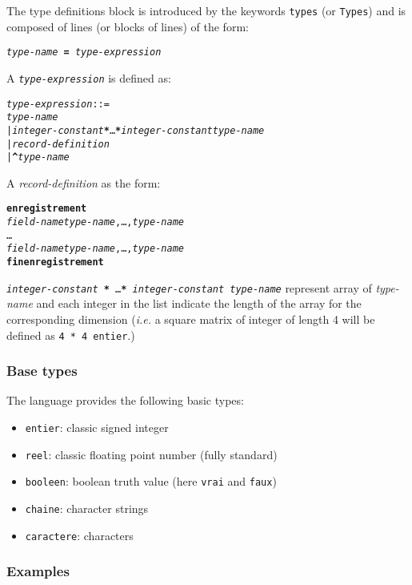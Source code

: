 \documentclass[a4paper, pdftex, 12pt]{article}
\begin{document}
The type definitions block is introduced by the keywords
\texttt{types} (or \texttt{Types}) and is composed of lines (or blocks
of lines) of the form:
\begin{center}
  \texttt{\textit{type-name} \textbf{=} \textit{type-expression}}
\end{center}

\noindent A \texttt{\textit{type-expression}} is defined as:
\begin{alltt}
\textit{type-expression} ::=
    \textit{type-name}
  | \textit{integer-constant} \textbf{*} \ldots \textbf{*} \textit{integer-constant} \textit{type-name}
  | \textit{record-definition}
  | \textbf{^}\textit{type-name}
\end{alltt}

\noindent A \textit{record-definition} as the form:
\begin{alltt}
\textbf{enregistrement}
  \textit{field-name} \textit{type-name}, \ldots, \textit{type-name}
           \ldots
  \textit{field-name} \textit{type-name}, \ldots, \textit{type-name}
\textbf{fin enregistrement}
\end{alltt}

\noindent\texttt{\textit{integer-constant} \textbf{*} \ldots \textbf{*}
  \textit{integer-constant} \textit{type-name}} represent array of
\textit{type-name} and each integer in the list indicate the length of
the array for the corresponding dimension (\emph{i.e.} a square matrix
of integer of length 4 will be defined as \texttt{4 * 4 entier}.)

\subsubsection{Base types}
\label{sec:btypes}

The language provides the following basic types:
\begin{itemize}
\item \texttt{entier}: classic signed integer
\item \texttt{reel}: classic floating point number (fully standard)
\item \texttt{booleen}: boolean truth value (here \texttt{vrai} and
  \texttt{faux})
\item \texttt{chaine}: character strings
\item \texttt{caractere}: characters
\end{itemize}

\subsubsection{Examples}
\label{sec:typeexample}
\end{document}
